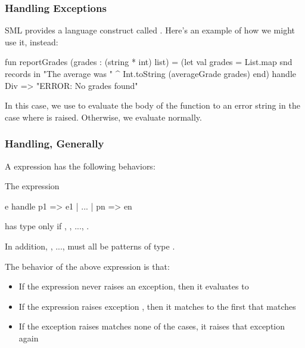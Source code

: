 \documentclass[aspectratio=169, handout]{beamer}
\begin{document}
\begin{frame}[fragile]
  \frametitle{Handling Exceptions}

  SML provides a language construct called . Here's an example
  of how we might use it, instead:

  \pause
  \begin{codeblock}
    fun reportGrades (grades : (string * int) list) =
      (let
        val grades = List.map snd records
      in
        "The average was " ^ Int.toString (averageGrade grades)
      end)
      handle Div => "ERROR: No grades found"
  \end{codeblock}

  \pause
  \vspace{\fill}

  In this case, we use  to evaluate the body of the function to
  an error string in the case where  is raised. Otherwise, we
  evaluate normally.
\end{frame}

\begin{frame}[fragile]
  \frametitle{Handling, Generally}

  A  expression has the following behaviors:

  \pause
  \vspace{\fill}

  The expression
  \begin{codeblock}
    e handle p1 => e1 | ... | pn => en
  \end{codeblock}

  has type  only if , , ..., .

  \pause
  \vspace{5pt}

  In addition, , ...,  must all be patterns of type
  .

  \pause
  \vspace{\fill}

  The behavior of the above  expression is that: \pause
  \begin{itemize}
    \item If the expression  never raises an exception, then it
    evaluates to  \pause
    \item If the expression  raises exception , then
    it matches to the first  that matches  \pause
    \item If the exception  raises matches none of the
     cases, it raises that exception again
  \end{itemize}
\end{frame}
\end{document}
